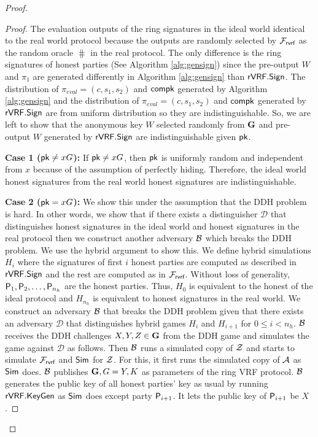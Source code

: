 \begin{proof}
		\begin{proof}
			The evaluation outputs of the ring signatures in the ideal world identical to the real world protocol because  the outputs are randomly selected by $ \mathcal{F}_{\textsf{rvrf}} $ as the random oracle $ \hash $ in the real protocol. The only difference is the ring signatures of honest parties (See Algorithm \ref{alg:gensign}) since the pre-output $ W $ and $ \pi_1 $ are generated differently in Algorithm \ref{alg:gensign} than $ {\mathsf{rVRF}}.{\mathsf{Sign}} $. The distribution of $ \pi_{eval} = (c,s_1, s_2) $ and $ \mathsf{compk} $ generated by Algorithm \ref{alg:gensign} and the distribution of $ \pi_{eval} = (c,s_1, s_2) $ and $ \mathsf{compk} $ generated by $ {\mathsf{rVRF}}.{\mathsf{Sign}} $ are from uniform distribution so they are indistinguishable. So, we are left to show that the anonymous key $ W $ selected randomly from $ {\mathbf{G}} $ and pre-output $	 W $ generated by $ {\mathsf{rVRF}}.{\mathsf{Sign}} $ are indistinguishable given $ \mathsf{pk}  $. 
			
			\textbf{Case 1 ($ \mathsf{pk} \neq x G$):} If  $ \mathsf{pk} \neq x G$, then  $ \mathsf{pk} $ is uniformly random and independent from $ x $ because of the assumption of perfectly hiding. Therefore,  the ideal world honest signatures from the real world honest signatures are indistinguishable.
			
			\textbf{Case 2 ($ \mathsf{pk} = x G$):} We  show this under the assumption that the DDH problem  is hard.  In other words, we show that if there exists a distinguisher $ \mathcal{D} $ that distinguishes honest signatures in the ideal world and honest signatures in the real protocol then we construct another adversary $ \mathcal{B} $ which breaks the DDH problem. 
			We use the hybrid argument to show this.
			We define hybrid simulations $ H_{i} $ where  the signatures of first $ i $ honest parties are computed as described in $ {\mathsf{rVRF}}.{\mathsf{Sign}} $ and the rest are computed as in $ \mathcal{F}_{\textsf{rvrf}} $. Without loss of generality, $ \mathsf{P}_1, \mathsf{P}_2, \ldots, \mathsf{P}_{n_h} $ are the honest parties. Thus, $ H_0 $ is equivalent to the honest of the ideal protocol  and $ H_{n_h}  $ is equivalent to  honest signatures in the real world.  We construct an adversary $ \mathcal{B} $ that breaks the DDH problem given that there exists an adversary $ \mathcal{D} $ that distinguishes hybrid games $ H_i $ and $ H_{i + 1} $ for $ 0 \leq i < n_h $. $\mathcal{B} $ receives the DDH challenges $ X,Y, Z \in {\mathbf{G}} $ from the DDH game and simulates the game against $ \mathcal{D} $ as follows. 
			Then $ \mathcal{B} $ runs a simulated copy of $ \mathcal{Z} $ and starts to simulate $ \mathcal{F}_{\textsf{rvrf}} $ and $ \mathsf{Sim} $ for $ \mathcal{Z} $. For this, it first runs the simulated copy of $ \mathcal{A} $ as $ \mathsf{Sim} $ does. $  \mathcal{B} $ publishes $ {\mathbf{G}}, G = Y, K $ as parameters of the ring VRF protocol. $\mathcal{B} $ generates the public key of all  honest parties' key as usual by running $ {\mathsf{rVRF}}.{\mathsf{KeyGen}}$ as $ \mathsf{Sim} $ does except party $ \mathsf{P}_{i+1} $. It lets the public key of $ \mathsf{P}_{i + 1} $ be $ X $.
		

\end{proof}
\end{proof}
